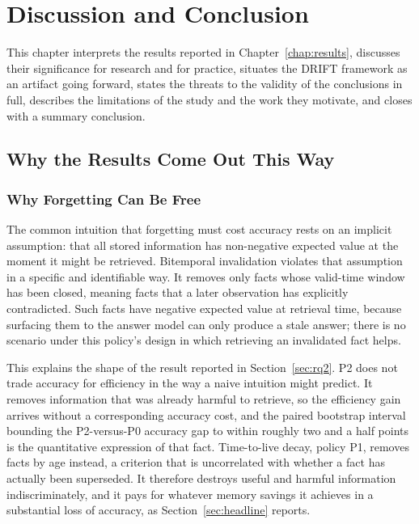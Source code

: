 \chapter{Discussion and Conclusion}
\label{chap:discussion}

This chapter interprets the results reported in Chapter~\ref{chap:results}, discusses their significance for research and for practice, situates the DRIFT framework as an artifact going forward, states the threats to the validity of the conclusions in full, describes the limitations of the study and the work they motivate, and closes with a summary conclusion.

\section{Why the Results Come Out This Way}
\label{sec:why-results}

\subsection{Why Forgetting Can Be Free}
\label{sec:why-forgetting-free}

The common intuition that forgetting must cost accuracy rests on an implicit assumption: that all stored information has non-negative expected value at the moment it might be retrieved. Bitemporal invalidation violates that assumption in a specific and identifiable way. It removes only facts whose valid-time window has been closed, meaning facts that a later observation has explicitly contradicted. Such facts have negative expected value at retrieval time, because surfacing them to the answer model can only produce a stale answer; there is no scenario under this policy's design in which retrieving an invalidated fact helps.

This explains the shape of the result reported in Section~\ref{sec:rq2}. P2 does not trade accuracy for efficiency in the way a naive intuition might predict. It removes information that was already harmful to retrieve, so the efficiency gain arrives without a corresponding accuracy cost, and the paired bootstrap interval bounding the P2-versus-P0 accuracy gap to within roughly two and a half points is the quantitative expression of that fact. Time-to-live decay, policy P1, removes facts by age instead, a criterion that is uncorrelated with whether a fact has actually been superseded. It therefore destroys useful and harmful information indiscriminately, and it pays for whatever memory savings it achieves in a substantial loss of accuracy, as Section~\ref{sec:headline} reports.

